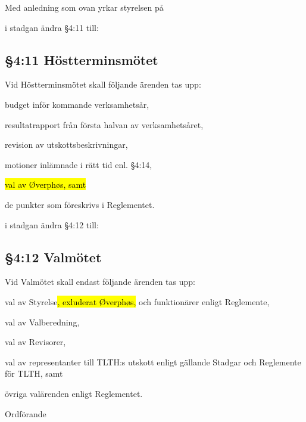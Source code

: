 \documentclass[../_main/handlingar.tex]{subfiles}
\begin{document}
Med anledning som ovan yrkar styrelsen på 

\begin{attsatser}
    \att i stadgan ändra \S4:11 till:
    \subsection*{\S4:11 Höstterminsmötet}
    Vid Höstterminsmötet skall följande ärenden tas upp:
    \begin{alphlist}
        \item 	budget inför kommande verksamhetsår,
        \item 	resultatrapport från första halvan av verksamhetsåret,
        \item 	revision av utskottsbeskrivningar,
        \item 	motioner inlämnade i rätt tid enl. §4:14,
        \item   \hl{val av Øverphøs, samt}
        \item 	de punkter som föreskrivs i Reglementet.
    \end{alphlist}
    \changenote
    \att i stadgan ändra \S4:12 till:
    \subsection*{\S4:12 Valmötet}
    Vid Valmötet skall endast följande ärenden tas upp:
    \begin{alphlist}
        \item val av Styrelse\hl{, exluderat Øverphøs,} och funktionärer enligt Reglemente,
        \item val av Valberedning,
        \item val av Revisorer,
        \item val av representanter till TLTH:s utskott enligt gällande Stadgar och
        Reglemente för TLTH, samt
        \item övriga valärenden enligt Reglementet.
    \end{alphlist}
    \changenote
\end{attsatser}

\begin{signatures}{1}
    \ist
    \signature{\ordf}{Ordförande}
\end{signatures}
\end{document}
